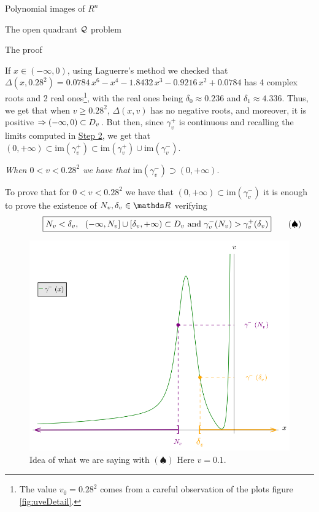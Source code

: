 \documentclass[11pt, a4paper, english, twoside, notitlepage]{report}
\begin{document}
\begin{chapter}{Polynomial images of $R^n$}
\begin{section}{The open quadrant $\mathcal{Q}$ problem}
\begin{subsection}{The proof}
\begin{Proof}
			If $x \in (-\infty, 0)$, using Laguerre's method we checked that $\Delta(x, 0.28^2)= 0.0784 \, x^{6} - x^{4} - 1.8432 \, x^{3} - 0.9216 \, x^{2} + 0.0784$ has 4 complex roots and 2 real ones\footnote{The value $v_0 = 0.28^2 $ comes from a careful observation of the plots figure \ref{fig:uveDetail}.}, with the real ones being $\delta_0 \approx 0.236$ and $\delta_1 \approx 4.336$. Thus, we get that when $v \ge 0.28^2$, $\Delta(x, v)$ has no negative roots, and moreover, it is positive $\Rightarrow (-\infty, 0) \subset D_v$. But then, since $\gamma_v^+$ is continuous and recalling the limits computed in \hyperref[step2]{Step 2}, we get that $(0, +\infty) \subset \text{im}(\gamma_v^+) \subset \text{im}(\gamma_v^+) \cup \text{im}(\gamma_v^-)$.
			
			\begin{center}
				 \emph{When $0 < v < 0.28^2$ we have that} $\text{im}(\gamma_v^-) \supset (0, +\infty)$.
			\end{center}\label{step4}
			
			To prove that for $0 < v < 0.28^2$ we have that $(0, +\infty) \subset \text{im}(\gamma_v^-)$ it is enough to prove the existence of $N_v, \delta_v\in \R$ verifying			
			\begin{equation*}\qquad \quad
				\boxed{
					 N_v < \delta_v,\ \ (-\infty, N_v] \cup [\delta_v, +\infty) \subset D_v \text{ and } \gamma_v^-(N_v) > \gamma_v^+(\delta_v)\\
				}\qquad (\spadesuit)
			\end{equation*}
			
			\begin{figure}[h]
				\centering
				\includegraphics[width=1\textwidth]{plots/ch1_12_idea.png}
				\caption{Idea of what we are saying with $(\spadesuit)$ Here $v = 0.1$.\label{fig:idea}}
			\end{figure}
			

\end{Proof}
\end{subsection}
\end{section}
\end{chapter}
\end{document}
